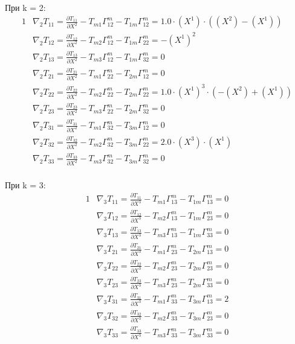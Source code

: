 \documentclass{article}
\begin{document}
При k = 2:\\
\begin{alignat*}{1}
  & \nabla_2T_{11} = \frac{\partial T_{11}}{\partial X^2} - T_{m1}\Gamma^m_{12} - T_{1m}\Gamma^m_{12} = 1.0\cdot (X^1)\cdot ((X^2) - (X^1)) \\
  & \nabla_2T_{12} = \frac{\partial T_{12}}{\partial X^2} - T_{m2}\Gamma^m_{12} - T_{1m}\Gamma^m_{22} = -(X^1)^2 \\
  & \nabla_2T_{13} = \frac{\partial T_{13}}{\partial X^2} - T_{m3}\Gamma^m_{12} - T_{1m}\Gamma^m_{32} = 0 \\
  & \nabla_2T_{21} = \frac{\partial T_{21}}{\partial X^2} - T_{m1}\Gamma^m_{22} - T_{2m}\Gamma^m_{12} = 0 \\
  & \nabla_2T_{22} = \frac{\partial T_{22}}{\partial X^2} - T_{m2}\Gamma^m_{22} - T_{2m}\Gamma^m_{22} = 1.0\cdot (X^1)^3\cdot (-(X^2) + (X^1)) \\
  & \nabla_2T_{23} = \frac{\partial T_{23}}{\partial X^2} - T_{m3}\Gamma^m_{22} - T_{2m}\Gamma^m_{32} = 0 \\
  & \nabla_2T_{31} = \frac{\partial T_{31}}{\partial X^2} - T_{m1}\Gamma^m_{32} - T_{3m}\Gamma^m_{12} = 0 \\
  & \nabla_2T_{32} = \frac{\partial T_{32}}{\partial X^2} - T_{m2}\Gamma^m_{32} - T_{3m}\Gamma^m_{22} = 2.0\cdot (X^3)\cdot (X^1) \\
  & \nabla_2T_{33} = \frac{\partial T_{33}}{\partial X^2} - T_{m3}\Gamma^m_{32} - T_{3m}\Gamma^m_{32} = 0 
\end{alignat*}\\
При k = 3:\\
\begin{alignat*}{1}
  & \nabla_3T_{11} = \frac{\partial T_{11}}{\partial X^3} - T_{m1}\Gamma^m_{13} - T_{1m}\Gamma^m_{13} = 0 \\
  & \nabla_3T_{12} = \frac{\partial T_{12}}{\partial X^3} - T_{m2}\Gamma^m_{13} - T_{1m}\Gamma^m_{23} = 0 \\
  & \nabla_3T_{13} = \frac{\partial T_{13}}{\partial X^3} - T_{m3}\Gamma^m_{13} - T_{1m}\Gamma^m_{33} = 0 \\
  & \nabla_3T_{21} = \frac{\partial T_{21}}{\partial X^3} - T_{m1}\Gamma^m_{23} - T_{2m}\Gamma^m_{13} = 0 \\
  & \nabla_3T_{22} = \frac{\partial T_{22}}{\partial X^3} - T_{m2}\Gamma^m_{23} - T_{2m}\Gamma^m_{23} = 0 \\
  & \nabla_3T_{23} = \frac{\partial T_{23}}{\partial X^3} - T_{m3}\Gamma^m_{23} - T_{2m}\Gamma^m_{33} = 0 \\
  & \nabla_3T_{31} = \frac{\partial T_{31}}{\partial X^3} - T_{m1}\Gamma^m_{33} - T_{3m}\Gamma^m_{13} = 2 \\
  & \nabla_3T_{32} = \frac{\partial T_{32}}{\partial X^3} - T_{m2}\Gamma^m_{33} - T_{3m}\Gamma^m_{23} = 0 \\
  & \nabla_3T_{33} = \frac{\partial T_{33}}{\partial X^3} - T_{m3}\Gamma^m_{33} - T_{3m}\Gamma^m_{33} = 0 
\end{alignat*}\\
\end{document}
